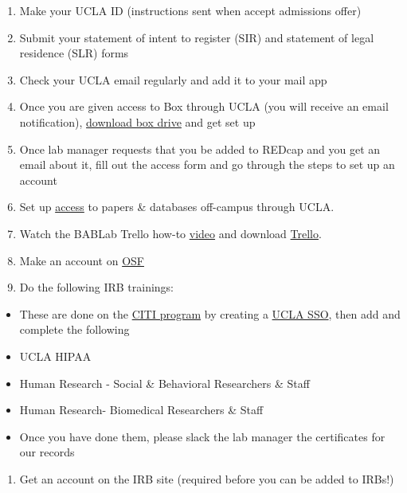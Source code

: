\documentclass[]{book}
\providecommand{\tightlist}{%
  \setlength{\itemsep}{0pt}\setlength{\parskip}{0pt}}
\begin{document}
\begin{enumerate}
\def\labelenumi{\arabic{enumi}.}
\tightlist
\item
  Make your UCLA ID (instructions sent when accept admissions offer)
\item
  Submit your statement of intent to register (SIR) and statement of
  legal residence (SLR) forms
\item
  Check your UCLA email regularly and add it to your mail app
\item
  Once you are given access to Box through UCLA (you will receive an
  email notification),
  \href{https://www.box.com/resources/downloads}{download box drive} and
  get set up
\item
  Once lab manager requests that you be added to REDcap and you get an
  email about it, fill out the access form and go through the steps to
  set up an account
\item
  Set up
  \href{https://www.library.ucla.edu/use/computers-computing-services/connect-campus}{access}
  to papers \& databases off-campus through UCLA.
\item
  Watch the BABLab Trello how-to
  \href{https://www.youtube.com/watch?v=_Ry-SnJygy8\&feature=youtu.be\&ab_channel=BABLab}{video}
  and download \href{https://trello.com/en-US/platforms}{Trello}.
\item
  Make an account on
  \href{https://accounts.osf.io/login?service=https://osf.io/myprojects/}{OSF}
\item
  Do the following IRB trainings:
\end{enumerate}

\begin{itemize}
\tightlist
\item
  These are done on the
  \href{https://www.research.ucla.edu/CITIProgram/}{CITI program} by
  creating a
  \href{https://ora.research.ucla.edu/OHRPP/Documents/Education/SSO_CITI_New_Acct.pdf}{UCLA
  SSO}, then add and complete the following
\item
  UCLA HIPAA
\item
  Human Research - Social \& Behavioral Researchers \& Staff
\item
  Human Research- Biomedical Researchers \& Staff
\item
  Once you have done them, please slack the lab manager the certificates
  for our records
\end{itemize}

\begin{enumerate}
\def\labelenumi{\arabic{enumi}.}
\setcounter{enumi}{9}
\tightlist
\item
  Get an account on the IRB site (required before you can be added to
  IRBs!)
\end{enumerate}
\end{document}
